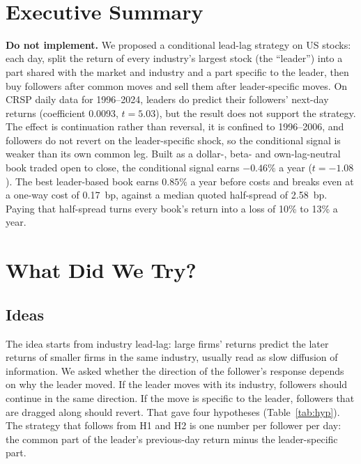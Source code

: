 \documentclass[11pt,letterpaper]{article}
\title{\textbf{\reporttitle}}
\author{\reportauthors}
\date{\reportcourse\\[0.2em]\reportdate}
\begin{document}
\maketitle
\thispagestyle{fancy}

\section{Executive Summary}

\textbf{Do not implement.} We proposed a conditional lead-lag strategy on US
stocks: each day, split the return of every industry's largest stock (the
``leader'') into a part shared with the market and industry and a part specific
to the leader, then buy followers after common moves and sell them after
leader-specific moves. On CRSP daily data for 1996--2024, leaders do predict
their followers' next-day returns (coefficient 0.0093, $t = 5.03$), but the
result does not support the strategy. The effect is continuation rather than
reversal, it is confined to 1996--2006, and followers do not revert on the
leader-specific shock, so the conditional signal is weaker than its own common
leg. Built as a dollar-, beta- and own-lag-neutral book traded open to close,
the conditional signal earns $-0.46\%$ a year ($t = -1.08$). The best
leader-based book earns $0.85\%$ a year before costs and breaks even at a
one-way cost of 0.17~bp, against a median quoted half-spread of 2.58~bp. Paying
that half-spread turns every book's return into a loss of 10\% to 13\% a year.

\section{What Did We Try?}

\subsection{Ideas}

The idea starts from industry lead-lag: large firms' returns predict the later
returns of smaller firms in the same industry, usually read as slow diffusion
of information. We asked whether the direction of the follower's response
depends on why the leader moved. If the leader moves with its industry,
followers should continue in the same direction. If the move is specific to the
leader, followers that are dragged along should revert. That gave four
hypotheses (Table~\ref{tab:hyp}). The strategy that follows from H1 and H2 is
one number per follower per day: the common part of the leader's previous-day
return minus the leader-specific part.
\end{document}
